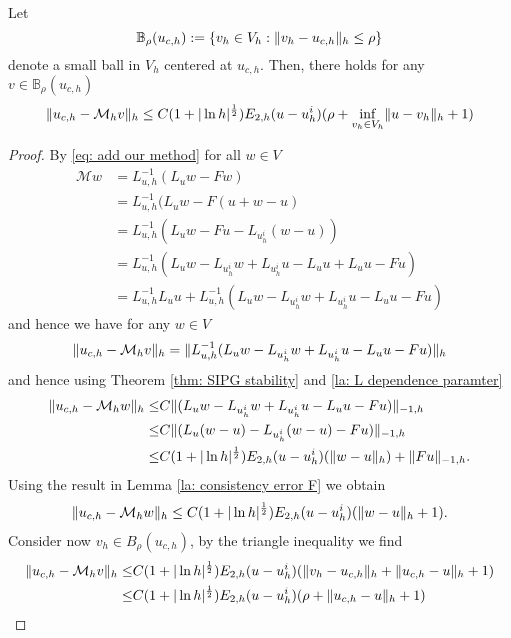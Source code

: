 \begin{lemma} \label{la: mapping property of M}
	Let 
	\[
		\mathbb B_\rho(u_{c,h}):=\{v_h \in V_h: \lVert v_h - u_{c,h} \rVert_{h} \leq \rho\}
	\]
	denote a small ball in $V_h$ centered at $u_{c,h}$. 
	Then, there holds for any $v \in \mathbb B_\rho(u_{c,h})$
	\[
		\lVert u_{c,h} - \mathcal M_h v \rVert_{h} \leq C (1+|\ln h|^{\frac 1 2}) E_{2,h}(u - u^i_h) (\rho+ \inf_{v_h \in V_h} \lVert u-v_h \rVert_{h}+1)
	\] 
\end{lemma}
\begin{proof}
By \eqref{eq: add our method} for all $w \in V$
\begin{align}
	\mathcal M w &= L_{u,h}^{-1}(L_u w - Fw) \nonumber\\
				 &= L_{u,h}^{-1}(L_u w - F(u+w-u) \nonumber\\
				 &= L_{u,h}^{-1}(L_u w - Fu - L_{u^i_h} (w-u)) \nonumber\\
				 &=  L_{u,h}^{-1}(L_u w - L_{u^i_h} w + L_{u^i_h}u - L_u u + L_u u - Fu) \nonumber\\
				 & = L_{u,h}^{-1} L_u u + L_{u,h}^{-1}(L_u w - L_{u^i_h} w + L_{u^i_h}u - L_u u - Fu) \label{eq: expand M}
 \end{align}	
 and hence we have for any $w \in V$
	\begin{align}
		\lVert u_{c,h} - \mathcal M_h v \rVert_{h} = \lVert L_{u,h}^{-1}(L_u w - L_{u^i_h} w + L_{u^i_h}u - L_u u - Fu) \rVert_{h}
	\end{align}
	and hence using Theorem \ref{thm: SIPG stability} and \ref{la: L dependence paramter}
	\begin{align*}
		\lVert u_{c,h} - \mathcal M_h w \rVert_{h} 
		\leq& C\lVert (L_u w - L_{u^i_h} w + L_{u^i_h} u- L_u u - Fu) \rVert_{-1,h} \nonumber\\
		\leq& C\lVert (L_u (w-u) - L_{u^i_h} (w-u) - Fu) \rVert_{-1,h} \nonumber\\
				\leq& C (1+|\ln h|^{\frac 1 2}) E_{2,h}(u - u^i_h) (\lVert w-u \rVert_{h}) +\lVert Fu \rVert_{-1,h}.
	\end{align*}
	Using the result in Lemma \ref{la: consistency error F} we obtain
	\begin{align*}
		\lVert u_{c,h} - \mathcal M_h w \rVert_{h} \leq C (1+|\ln h|^{\frac 1 2}) E_{2,h}(u - u^i_h) (\lVert w-u \rVert_{h}+1).
	\end{align*}
	Consider now $v_h \in B_\rho(u_{c,h})$, by the triangle inequality we find 
	\begin{align}
		\lVert u_{c,h} - \mathcal M_h v \rVert_{h} 
			\leq& C (1+|\ln h|^{\frac 1 2}) E_{2,h}(u - u^i_h) (\lVert v_h-u_{c,h} \rVert_{h}+ \lVert u_{c,h}-u \rVert_{h} +1) \nonumber \\
			\leq& C (1+|\ln h|^{\frac 1 2}) E_{2,h}(u - u^i_h) (\rho+ \lVert u_{c,h}-u \rVert_{h} +1)			
	\end{align}
\end{proof}

